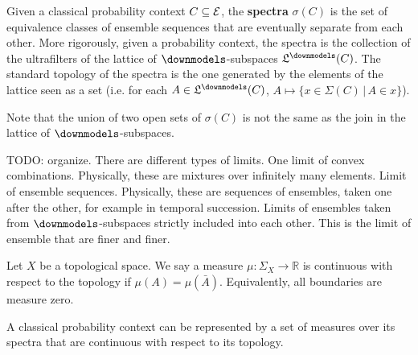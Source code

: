 
\begin{defn}
	Given a classical probability context $C \subseteq \mathcal{E}$, the \textbf{spectra} $\sigma(C)$ is the set of equivalence classes of ensemble sequences that are eventually separate from each other. More rigorously, given a probability context, the spectra is the collection of the ultrafilters of the lattice of $\separate$-subspaces $\mathfrak{L}^\separate(C)$. The standard topology of the spectra is the one generated by the elements of the lattice seen as a set (i.e. for each $A \in \mathfrak{L}^\separate(C)$, $A \mapsto \{ x \in \Sigma(C) \, | \, A \in x \}$).
\end{defn}

\begin{remark}
	Note that the union of two open sets of $\sigma(C)$ is not the same as the join in the lattice of $\separate$-subspaces.
\end{remark}

\begin{remark}
	TODO: organize. There are different types of limits. One limit of convex combinations. Physically, these are mixtures over infinitely many elements. Limit of ensemble sequences. Physically, these are sequences of ensembles, taken one after the other, for example in temporal succession. Limits of ensembles taken from $\separate$-subspaces strictly included into each other. This is the limit of ensemble that are finer and finer.
\end{remark}

\begin{defn}
	Let $X$ be a topological space. We say a measure $\mu : \Sigma_X \to \mathbb{R}$ is continuous with respect to the topology if $\mu(A) = \mu(\bar{A})$. Equivalently, all boundaries are measure zero.
\end{defn}

\begin{prop}
	A classical probability context can be represented by a set of measures over its spectra that are continuous with respect to its topology.
\end{prop}

